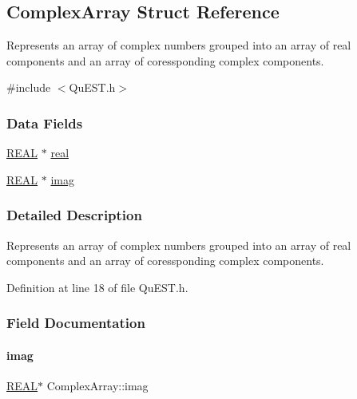 \hypertarget{structComplexArray}{}\subsection{Complex\+Array Struct Reference}
\label{structComplexArray}


Represents an array of complex numbers grouped into an array of real components and an array of coressponding complex components.  




{\ttfamily \#include $<$Qu\+E\+S\+T.\+h$>$}

\subsubsection*{Data Fields}
\begin{DoxyCompactItemize}
\item 
\mbox{\hyperlink{QuEST__precision_8h_a4b654506f18b8bfd61ad2a29a7e38c25}{R\+E\+AL}} $\ast$ \mbox{\hyperlink{structComplexArray_a4195cac6c784ea1b6271f1c7dba1548a}{real}}
\item 
\mbox{\hyperlink{QuEST__precision_8h_a4b654506f18b8bfd61ad2a29a7e38c25}{R\+E\+AL}} $\ast$ \mbox{\hyperlink{structComplexArray_a79dde47c7ae530c79cebfdf57b225968}{imag}}
\end{DoxyCompactItemize}


\subsubsection{Detailed Description}
Represents an array of complex numbers grouped into an array of real components and an array of coressponding complex components. 

Definition at line 18 of file Qu\+E\+S\+T.\+h.



\subsubsection{Field Documentation}
\mbox{\label{structComplexArray_a79dde47c7ae530c79cebfdf57b225968}} 
\paragraph{\texorpdfstring{imag}{imag}}
{\footnotesize\ttfamily \mbox{\hyperlink{QuEST__precision_8h_a4b654506f18b8bfd61ad2a29a7e38c25}{R\+E\+AL}}$\ast$ Complex\+Array\+::imag}



